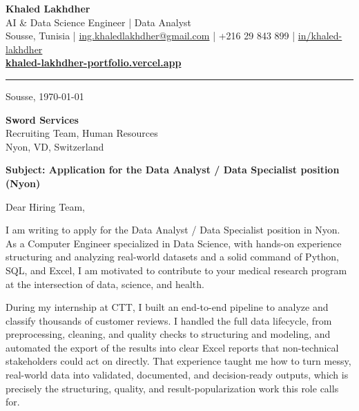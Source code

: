 \documentclass[11pt,a4paper]{article}
\begin{document}
\begin{center}
  {\LARGE\bfseries\color{accent} Khaled Lakhdher}\\[2pt]
  {\large\color{muted} AI \& Data Science Engineer \;|\; Data Analyst}\\[4pt]
  {\small\color{muted}
    Sousse, Tunisia \quad|\quad
    \href{mailto:ing.khaledlakhdher@gmail.com}{ing.khaledlakhdher@gmail.com} \quad|\quad
    +216 29 843 899 \quad|\quad
    \href{https://www.linkedin.com/in/khaled-lakhdher}{in/khaled-lakhdher}
  }\\[2pt]
  {\small\href{https://khaled-lakhdher-portfolio.vercel.app}{\textbf{\color{accent}khaled-lakhdher-portfolio.vercel.app}}}
\end{center}

\vspace{4pt}
{\color{muted!40}\hrule}
\vspace{10pt}

\hfill Sousse, \today

\textbf{Sword Services}\\
Recruiting Team, Human Resources\\
Nyon, VD, Switzerland

\vspace{4pt}
\textbf{Subject: Application for the Data Analyst / Data Specialist position (Nyon)}

\vspace{6pt}
Dear Hiring Team,

I am writing to apply for the Data Analyst / Data Specialist position in Nyon. As a Computer Engineer specialized in Data Science, with hands-on experience structuring and analyzing real-world datasets and a solid command of Python, SQL, and Excel, I am motivated to contribute to your medical research program at the intersection of data, science, and health.

During my internship at CTT, I built an end-to-end pipeline to analyze and classify thousands of customer reviews. I handled the full data lifecycle, from preprocessing, cleaning, and quality checks to structuring and modeling, and automated the export of the results into clear Excel reports that non-technical stakeholders could act on directly. That experience taught me how to turn messy, real-world data into validated, documented, and decision-ready outputs, which is precisely the structuring, quality, and result-popularization work this role calls for.
\end{document}
